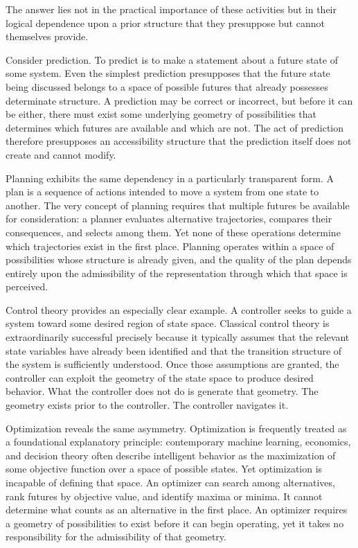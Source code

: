 \documentclass[12pt,a4paper]{article}
\theoremstyle{plain}
\theoremstyle{definition}
\theoremstyle{remark}
\begin{document}
The answer lies not in the practical importance of these activities but in
their logical dependence upon a prior structure that they presuppose but
cannot themselves provide.

Consider prediction. To predict is to make a statement about a future state
of some system. Even the simplest prediction presupposes that the future
state being discussed belongs to a space of possible futures that already
possesses determinate structure. A prediction may be correct or incorrect,
but before it can be either, there must exist some underlying geometry of
possibilities that determines which futures are available and which are not.
The act of prediction therefore presupposes an accessibility structure that
the prediction itself does not create and cannot modify.

Planning exhibits the same dependency in a particularly transparent form. A
plan is a sequence of actions intended to move a system from one state to
another. The very concept of planning requires that multiple futures be
available for consideration: a planner evaluates alternative trajectories,
compares their consequences, and selects among them. Yet none of these
operations determine which trajectories exist in the first place. Planning
operates within a space of possibilities whose structure is already given,
and the quality of the plan depends entirely upon the admissibility of the
representation through which that space is perceived.

Control theory provides an especially clear example. A controller seeks to
guide a system toward some desired region of state space. Classical control
theory is extraordinarily successful precisely because it typically assumes
that the relevant state variables have already been identified and that the
transition structure of the system is sufficiently understood. Once those
assumptions are granted, the controller can exploit the geometry of the state
space to produce desired behavior. What the controller does not do is
generate that geometry. The geometry exists prior to the controller. The
controller navigates it.

Optimization reveals the same asymmetry. Optimization is frequently treated
as a foundational explanatory principle: contemporary machine learning,
economics, and decision theory often describe intelligent behavior as the
maximization of some objective function over a space of possible states. Yet
optimization is incapable of defining that space. An optimizer can search
among alternatives, rank futures by objective value, and identify maxima or
minima. It cannot determine what counts as an alternative in the first place.
An optimizer requires a geometry of possibilities to exist before it can
begin operating, yet it takes no responsibility for the admissibility of that
geometry.
\end{document}
